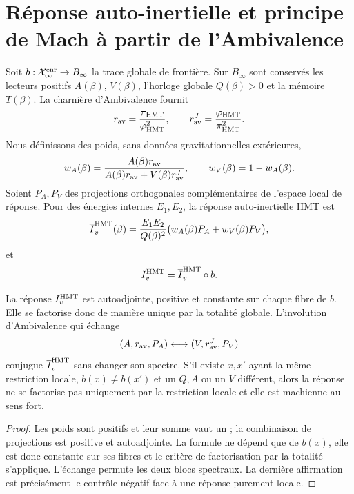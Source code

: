 \section{Réponse auto-inertielle et principe de Mach à partir de l'Ambivalence}
\label{sec:hmtf2-mach-ambivalencia}

Soit \(b:\mathcal X_\infty^{\rm enr}\to B_\infty\) la trace globale de
frontière. Sur \(B_\infty\) sont conservés les lecteurs positifs
\(A(\beta)\), \(V(\beta)\), l'horloge globale \(Q(\beta)>0\) et la mémoire
\(T(\beta)\). La charnière d'Ambivalence fournit
\[
 r_{\rm av}=\frac{\pi_{\rm HMT}}{\varphi_{\rm HMT}^2},
 \qquad
 r_{\rm av}^J=\frac{\varphi_{\rm HMT}}{\pi_{\rm HMT}^2}.
\]
Nous définissons des poids, sans données gravitationnelles extérieures,
\[
 w_A(\beta)
 =\frac{A(\beta)r_{\rm av}}
 {A(\beta)r_{\rm av}+V(\beta)r_{\rm av}^J},
 \qquad
 w_V(\beta)=1-w_A(\beta).
\]
Soient \(P_A,P_V\) des projections orthogonales complémentaires de l'espace local
de réponse. Pour des énergies internes \(E_1,E_2\), la réponse
auto-inertielle HMT est
\[
 \overline I_v^{\rm HMT}(\beta)
 =\frac{E_1E_2}{Q(\beta)^2}
 \bigl(w_A(\beta)P_A+w_V(\beta)P_V\bigr),
\]
et
\[
 I_v^{\rm HMT}
 =\overline I_v^{\rm HMT}\circ b.
\]

\begin{theorem}
\label{thm:hmtf2-respuesta-mach}
La réponse \(I_v^{\rm HMT}\) est autoadjointe, positive et constante sur chaque
fibre de \(b\). Elle se factorise donc de manière unique par la totalité globale.
L'involution d'Ambivalence qui échange
\[
 (A,r_{\rm av},P_A)\longleftrightarrow
 (V,r_{\rm av}^J,P_V)
\]
conjugue \(\overline I_v^{\rm HMT}\) sans changer son spectre. S'il existe
\(x,x'\) ayant la même restriction locale, \(b(x)\ne b(x')\) et un
\(Q,A\) ou un \(V\) différent, alors la réponse ne se factorise pas uniquement par la restriction
locale et elle est machienne au sens fort.
\end{theorem}

\begin{proof}
Les poids sont positifs et leur somme vaut un ; la combinaison de projections est
positive et autoadjointe. La formule ne dépend que de \(b(x)\), elle est donc
constante sur ses fibres et le critère de factorisation par la
totalité s'applique. L'échange permute les deux blocs spectraux. La dernière
affirmation est précisément le contrôle négatif face à une réponse
purement locale.
\end{proof}


